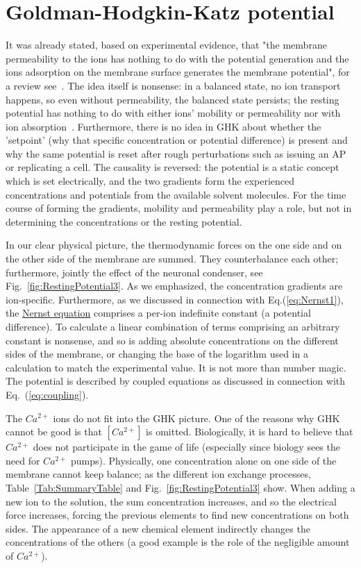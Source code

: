 \section{Goldman-Hodgkin-Katz potential\label{sec:Physics-Goldman-Hodgkin-Katz}}


It was already stated, based on experimental evidence, that "the membrane permeability to the ions has nothing to do with the potential generation and the ions adsorption on the membrane surface generates the membrane potential", for a review see~\cite{MembranePotentialPermeability:2024}.
The idea itself is nonsense: in a balanced state, no ion transport happens, so even without permeability, the balanced state persists;  the resting potential has nothing to do with either ions' mobility or permeability nor with ion absorption~\cite{Hodgkin-HuxleyAdsorption:2021}.
Furthermore, there is no idea in \gls{GHK} about whether the 'setpoint' (why that specific concentration or potential difference) is present and why the same potential is reset after rough perturbations such as issuing an \gls{AP} or replicating a cell.
The causality is reversed: the potential is a static concept which is set electrically, and
the two gradients form the experienced concentrations and potentials from the available solvent molecules.
For the time course of forming the gradients, mobility and permeability play a role, but not in determining the concentrations or the resting potential.


In our clear physical picture, the thermodynamic forces on the one side
and on the other side of the membrane are summed. They counterbalance each other; furthermore, jointly the effect of the neuronal condenser, see  Fig.~\ref{fig:RestingPotential3}.
As we emphasized, the concentration gradients are ion-specific.
Furthermore, as we discussed in connection with Eq.(\ref{eq:Nernst1}), the \hyperlink{NernstLaw}{Nernst equation} comprises a per-ion indefinite constant (a potential difference).
To calculate a linear combination of terms comprising an arbitrary constant is nonsense,
and so is adding absolute concentrations on the different sides of the membrane, or changing the base of the logarithm used in a calculation to match
the experimental value. It is not more than number magic. The potential is described by coupled equations as discussed in connection with Eq.~(\ref{eq:coupling}).

The $Ca^{2+}$ ions do not fit into the \gls{GHK} picture. 
One of the reasons why \gls{GHK} cannot be good is that $[Ca^{2+}]$
is omitted. Biologically, it is hard to believe that $Ca^{2+}$ does not participate in the game of life (especially since biology sees the need for $Ca^{2+}$ pumps). Physically, one concentration alone on one side of the membrane cannot keep balance; as the different ion exchange processes, Table~\ref{Tab:SummaryTable} and Fig.~\ref{fig:RestingPotential3} show.
When adding a new ion to the solution, the sum concentration
increases, and so the electrical force increases, forcing the previous 
elements to find new concentrations on both sides.
The appearance of a new chemical element indirectly changes the concentrations of the others (a good example is the role of the negligible amount of $Ca^{2+}$).

